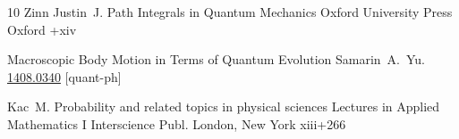\begin{thebibliography}{10}
\by Zinn Justin~J.
\book Path Integrals in Quantum Mechanics
\publ Oxford University Press
\publaddr Oxford
+xiv


\preprint  Macroscopic Body Motion in Terms of Quantum Evolution
\by Samarin~A.~Yu.
\arxiv \href{http://arxiv.org/abs/1408.0340}{1408.0340} [quant-ph]


\by Kac~M.
\book Probability and related topics in physical sciences
\serial Lectures in Applied Mathematics
\vol I
\publ Interscience Publ.
\publaddr London, New York 
\totalpages xiii+266 


\end{thebibliography}


\EngDate

\renewcommand{\baselinestretch}{0.9}

 \newpage
\Russian
%

%
%
